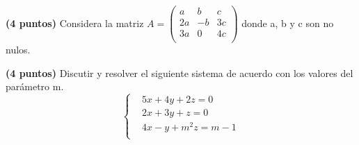 \documentclass[addpoints,spanish, 12pt,a4paper]{exam}
\begin{document}
\begin{questions}

\question \textbf{(4 puntos)} Considera la matriz $A=\left( \begin{matrix}
   a & b & c  \\
   2a & -b & 3c  \\
   3a & 0 & 4c  \\
\end{matrix} \right)$ donde a, b y c son no nulos.



\question \textbf{(4 puntos)} Discutir y resolver el siguiente sistema de acuerdo con los valores del parámetro m.
	$$\left\{ \begin{matrix}
  & 5x+4y+2z=0 \\ 
 & 2x+3y+z=0 \\ 
 & 4x-y+{{m}^{2}}z=m-1 \\ 
\end{matrix} \right.$$	


\end{questions}
\end{document}
